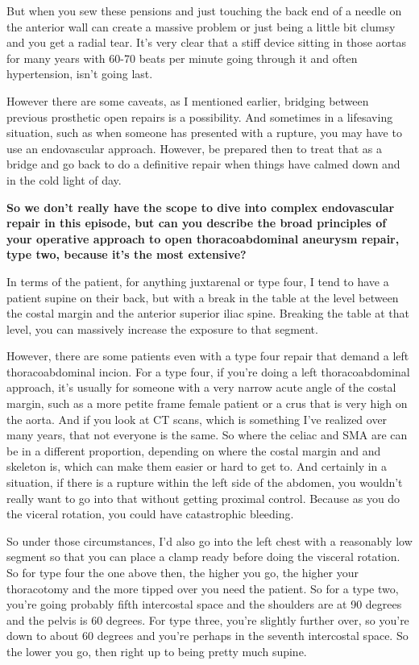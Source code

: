 \documentclass[
]{book}
\begin{document}
But when you sew these pensions and just touching the back end of a
needle on the anterior wall can create a massive problem or just being a
little bit clumsy and you get a radial tear. It's very clear that a
stiff device sitting in those aortas for many years with 60-70 beats per
minute going through it and often hypertension, isn't going last.

However there are some caveats, as I mentioned earlier, bridging between
previous prosthetic open repairs is a possibility. And sometimes in a
lifesaving situation, such as when someone has presented with a rupture,
you may have to use an endovascular approach. However, be prepared then
to treat that as a bridge and go back to do a definitive repair when
things have calmed down and in the cold light of day.

\textbf{So we don't really have the scope to dive into complex endovascular
repair in this episode, but can you describe the broad principles of
your operative approach to open thoracoabdominal aneurysm repair, type
two, because it's the most extensive?}

In terms of the patient, for anything juxtarenal or type four, I tend to
have a patient supine on their back, but with a break in the table at
the level between the costal margin and the anterior superior iliac
spine. Breaking the table at that level, you can massively increase the
exposure to that segment.

However, there are some patients even with a type four repair that
demand a left thoracoabdominal incion. For a type four, if you're doing
a left thoracoabdominal approach, it's usually for someone with a very
narrow acute angle of the costal margin, such as a more petite frame
female patient or a crus that is very high on the aorta. And if you look
at CT scans, which is something I've realized over many years, that not
everyone is the same. So where the celiac and SMA are can be in a
different proportion, depending on where the costal margin and and
skeleton is, which can make them easier or hard to get to. And certainly
in a situation, if there is a rupture within the left side of the
abdomen, you wouldn't really want to go into that without getting
proximal control. Because as you do the viceral rotation, you could have
catastrophic bleeding.

So under those circumstances, I'd also go into the left chest with a
reasonably low segment so that you can place a clamp ready before doing
the visceral rotation. So for type four the one above then, the higher
you go, the higher your thoracotomy and the more tipped over you need
the patient. So for a type two, you're going probably fifth intercostal
space and the shoulders are at 90 degrees and the pelvis is 60 degrees.
For type three, you're slightly further over, so you're down to about 60
degrees and you're perhaps in the seventh intercostal space. So the
lower you go, then right up to being pretty much supine.
\end{document}
